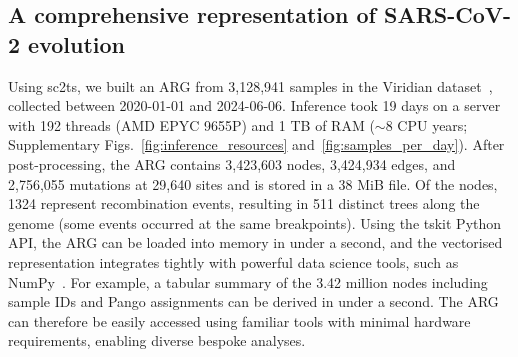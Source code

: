 \documentclass[12pt]{article}
\makeatletter
\newcommand{\refprefix}[1]{#1~}
\newcommand{\numref}[1]{{\let\refprefix\@gobble\ref{#1}}}
\makeatother
\begin{document}
\subsection*{A comprehensive representation of SARS-CoV-2 evolution}

Using sc2ts, we built an ARG from 3,128,941 samples
in the Viridian dataset~\cite{Hunt2026},
collected between 2020-01-01 and 2024-06-06.
Inference took 19 days on a server with
192 threads (AMD EPYC 9655P) and 1 TB of RAM
($\sim$8 CPU years;
Supplementary Figs.~\numref{fig:inference_resources} and~\numref{fig:samples_per_day}).
After post-processing, the ARG contains
3,423,603 nodes,  %
3,424,934 edges, and
2,756,055 mutations
at 29,640 sites
and is stored in a 38 MiB file.
Of the nodes, 1324 represent recombination events,
resulting in 511 distinct trees along the genome
(some events occurred at the same breakpoints).
Using the tskit Python API,
the ARG can be loaded into memory in under a second,
and the vectorised representation integrates tightly
with powerful data science tools, such as NumPy~\cite{Harris2020array}.
For example, a tabular summary of the 3.42 million nodes
including sample IDs and Pango assignments
can be derived in under a second.
The ARG can therefore be easily accessed using familiar tools
with minimal hardware requirements, enabling diverse bespoke analyses.

\end{document}
